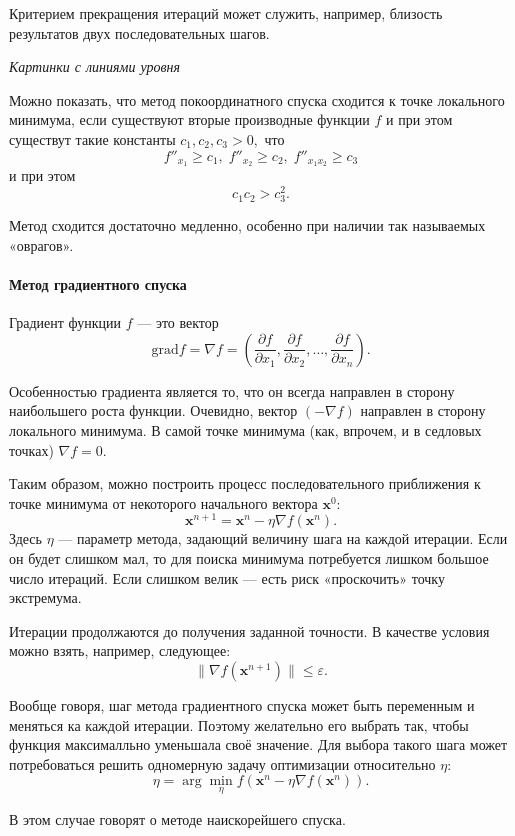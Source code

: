 Критерием прекращения итераций может служить, например, близость результатов
двух последовательных шагов.

\emph{Картинки с линиями уровня}

Можно показать, что метод покоординатного спуска сходится к точке
локального минимума, если существуют вторые производные функции $f$
и при этом существут такие константы $c_{1},c_{2},c_{3}>0,$ что
\[
f''_{x_{1}}\geqslant c_{1},\; f''_{x_{2}}\geqslant c_{2},\; f''_{x_{1}x_{2}}\geqslant c_{3}
\]
и при этом
\[
c_{1}c_{2}>c_{3}^{2}.
\]


Метод сходится достаточно медленно, особенно при наличии так называемых
«оврагов».


\paragraph{Метод градиентного спуска}

Градиент функции $f$ — это вектор
\[
\mathrm{grad}f=\nabla f=\left(\frac{\partial f}{\partial x_{1}},\frac{\partial f}{\partial x_{2}},\dots,\frac{\partial f}{\partial x_{n}}\right).
\]


Особенностью градиента является то, что он всегда направлен в сторону
наибольшего роста функции. Очевидно, вектор $(-\nabla f)$ направлен
в сторону локального минимума. В самой точке минимума (как, впрочем,
и в седловых точках) $\nabla f=0$.

Таким образом, можно построить процесс последовательного приближения
к точке минимума от некоторого начального вектора $\mathbf{x}^{0}$:
\[
\mathbf{x}^{n+1}=\mathbf{x}^{n}-\eta\nabla f(\mathbf{x}^{n}).
\]
Здесь $\eta$ — параметр метода, задающий величину шага на каждой
итерации. Если он будет слишком мал, то для поиска минимума потребуется
лишком большое число итераций. Если слишком велик — есть риск «проскочить»
точку экстремума.

Итерации продолжаются до получения заданной точности. В качестве условия
можно взять, например, следующее:
\[
\|\nabla f(\mathbf{x}^{n+1})\|\leqslant\varepsilon.
\]


Вообще говоря, шаг метода градиентного спуска может быть переменным
и меняться ка каждой итерации. Поэтому желательно его выбрать так,
чтобы функция максималльно уменьшала своё значение. Для выбора такого
шага может потребоваться решить одномерную задачу оптимизации относительно
$\eta$:
\[
\eta=\arg\min_{\eta}f(\mathbf{x}^{n}-\eta\nabla f(\mathbf{x}^{n})).
\]


В этом случае говорят о методе наискорейшего спуска.



